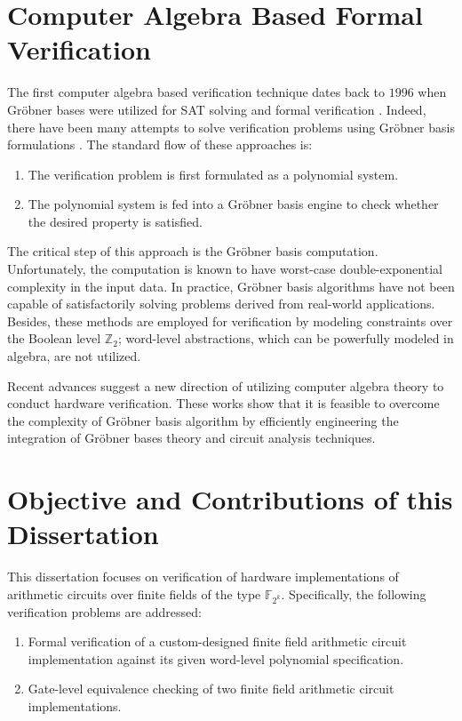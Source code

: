 \section{Computer Algebra Based Formal Verification}

The first computer algebra based verification technique dates back to
$1996$  when Gr\"{o}bner bases were utilized for SAT solving and
formal verification \cite{CEI:stoc-96}. Indeed, there have been many
attempts to solve verification problems using Gr\"obner basis
formulations  \cite{Avrunin:CAV} \cite{condrat-tacas07}
\cite{gbverify:2007}. The standard flow of these approaches is:
\begin{enumerate}
	\item The verification problem is first formulated as a polynomial system.
	\item The polynomial system is fed into a Gr\"obner basis
          engine to check whether the desired property is satisfied. 
\end{enumerate}
 
The critical step of this approach is the Gr\"obner basis
computation. Unfortunately, the computation is known to have
worst-case double-exponential complexity in the input data. In
practice, Gr\"obner basis algorithms have not been capable of
satisfactorily solving problems derived from real-world
applications. Besides, these methods are employed for verification by
modeling constraints over the Boolean level $\mathbb{Z}_2$; word-level
abstractions, which can be powerfully modeled in algebra, are not
utilized. 

Recent advances \cite{wienand:cav08} \cite{lv:hldvt2011}
\cite{wedler:date11} \cite{lv:vlsi2012} \cite{lv:date2012} suggest a
new direction of utilizing computer algebra theory to conduct hardware
verification.  These works show that it is feasible to overcome the
complexity of Gr\"obner basis algorithm by efficiently engineering
the integration of Gr\"obner bases theory and circuit analysis
techniques. 


\section{Objective and Contributions of this Dissertation}

This dissertation focuses on verification of hardware implementations
of arithmetic circuits over finite fields of the type
$\mathbb{F}_{2^k}$. Specifically, the following verification problems
are addressed:
\begin{enumerate}
\item Formal verification of a custom-designed finite field arithmetic
  circuit implementation against its given word-level polynomial
  specification. 
\item Gate-level equivalence checking of two finite field arithmetic
  circuit implementations.  
\end{enumerate}

